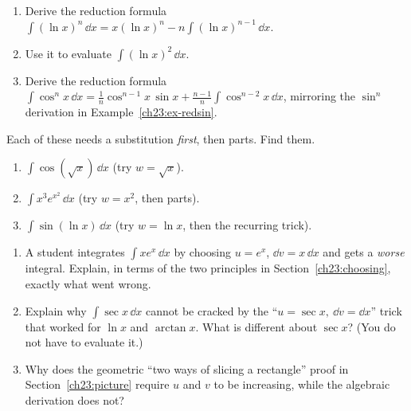 \begin{exercise}
\label{ch23:exr-reduction}
\begin{enumerate}[label=(\alph*)]
\item Derive the reduction formula
$\displaystyle\int (\ln x)^n\,\dd x = x(\ln x)^n - n\int(\ln x)^{n-1}\,\dd x$.
\item Use it to evaluate $\displaystyle\int (\ln x)^2\,\dd x$.
\item Derive the reduction formula
$\displaystyle\int\cos^n x\,\dd x = \frac{1}{n}\cos^{n-1}x\,\sin x
+ \frac{n-1}{n}\int\cos^{n-2}x\,\dd x$, mirroring the $\sin^n$ derivation in
Example~\ref{ch23:ex-redsin}.
\end{enumerate}
\end{exercise}

\begin{exercise}
\label{ch23:exr-combine}
Each of these needs a substitution \emph{first}, then parts. Find them.
\begin{enumerate}[label=(\alph*)]
\item $\displaystyle\int \cos(\sqrt{x})\,\dd x$ \quad (try $w=\sqrt{x}$).
\item $\displaystyle\int x^3 e^{x^2}\,\dd x$ \quad (try $w=x^2$, then parts).
\item $\displaystyle\int \sin(\ln x)\,\dd x$ \quad (try $w=\ln x$, then the
recurring trick).
\end{enumerate}
\end{exercise}

\begin{exercise}[Conceptual]
\label{ch23:exr-concept}
\begin{enumerate}[label=(\alph*)]
\item A student integrates $\int x e^x\,\dd x$ by choosing $u=e^x$,
$\dd v = x\,\dd x$ and gets a \emph{worse} integral. Explain, in terms of the two
principles in Section~\ref{ch23:choosing}, exactly what went wrong.
\item Explain why $\int \sec x\,\dd x$ cannot be cracked by the
``$u=\sec x,\ \dd v=\dd x$'' trick that worked for $\ln x$ and $\arctan x$. What is
different about $\sec x$? (You do not have to evaluate it.)
\item Why does the geometric ``two ways of slicing a rectangle'' proof in
Section~\ref{ch23:picture} require $u$ and $v$ to be increasing, while the
algebraic derivation does not?
\end{enumerate}
\end{exercise}

